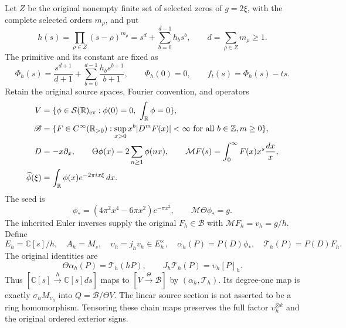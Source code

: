 \documentclass[11pt]{article}
\newcommand{\C}{\mathbb C}
\newcommand{\BB}{\mathscr B}
\begin{document}
Let $Z$ be the original nonempty finite set of selected zeros of
$g=2\xi$, with the complete selected orders $m_\rho$, and put
\begin{equation}
 h(s)=\prod_{\rho\in Z}(s-\rho)^{m_\rho}
     =s^d+\sum_{b=0}^{d-1}h_bs^b,
 \qquad d=\sum_{\rho\in Z}m_\rho\ge1.
 \label{eq:h}
\end{equation}
The primitive and its constant are fixed as
\begin{equation}
 \Phi_h(s)=\frac{s^{d+1}}{d+1}
       +\sum_{b=0}^{d-1}\frac{h_bs^{b+1}}{b+1},
 \qquad \Phi_h(0)=0,
 \qquad f_t(s)=\Phi_h(s)-ts.
 \label{eq:phase}
\end{equation}
Retain the original source spaces, Fourier convention, and operators
\begin{align}
 V&=\{\phi\in\mathcal S(\mathbb R)_{\rm ev}:
          \phi(0)=0,\ \int_{\mathbb R}\phi=0\},\nonumber\\
 \BB&=\{F\in C^\infty(\mathbb R_{>0}):
      \sup_{x>0}x^b|D^mF(x)|<\infty
              \text{ for all }b\in\mathbb Z,m\ge0\},\nonumber\\
 D&=-x\partial_x,\qquad
 \Theta\phi(x)=2\sum_{n\ge1}\phi(nx),\qquad
 \mathcal MF(s)=\int_0^\infty F(x)x^s\frac{dx}{x},
 \label{eq:source}\\
 \widehat\phi(\xi)&=\int_{\mathbb R}\phi(x)e^{-2\pi ix\xi}\,dx.
 \nonumber
\end{align}
The seed is
\begin{equation}
 \phi_*=(4\pi^2x^4-6\pi x^2)e^{-\pi x^2},
 \qquad \mathcal M\Theta\phi_*=g.
\end{equation}
The inherited Euler inverses supply the original $F_h\in\BB$ with
$\mathcal MF_h=v_h=g/h$.  Define
\begin{equation}
 E_h=\C[s]/h,\quad A_h=M_s,\quad
 \upsilon_h=j_hv_h\in E_h^\times,\quad
 \alpha_h(P)=P(D)\phi_*,\quad \mathcal T_h(P)=P(D)F_h.
 \label{eq:maps}
\end{equation}
The original identities are
\begin{equation}
 \Theta\alpha_h(P)=\mathcal T_h(hP),\qquad
 J_h\mathcal T_h(P)=\upsilon_h[P]_h.
 \label{eq:source-square}
\end{equation}
Thus $[\C[s]\xrightarrow{h}\C[s]ds]$ maps to
$[V\xrightarrow{\Theta}\BB]$ by $(\alpha_h,\mathcal T_h)$.
Its degree-one map is exactly $\sigma_hM_{\upsilon_h}$ into
$Q=\BB/\Theta V$.  The linear source section is not asserted to be a
ring homomorphism.  Tensoring these chain maps preserves the full factor
$\upsilon_h^{\otimes k}$ and the original ordered exterior signs.
\end{document}
